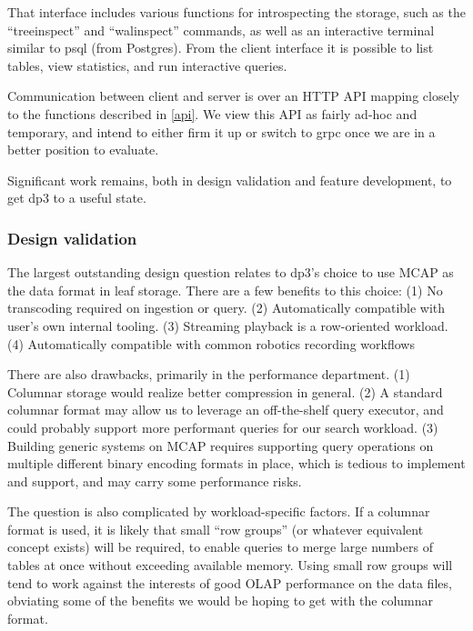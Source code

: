 \documentclass[9pt,twocolumn]{article}
\newcommand{\q}[1]{``#1''}
\begin{document}
    That interface includes various functions for introspecting the storage,
    such as the \q{treeinspect} and \q{walinspect} commands, as well as an
    interactive terminal similar to psql (from Postgres). From the client
    interface it is possible to list tables, view statistics, and run
    interactive queries.

    Communication between client and server is over an HTTP API mapping closely
    to the functions described in \ref{api}. We view this API as fairly ad-hoc
    and temporary, and intend to either firm it up or switch to grpc once we
    are in a better position to evaluate.

    Significant work remains, both in design validation and feature
    development, to get dp3 to a useful state.


    \subsubsection{Design validation}
    The largest outstanding design question relates to dp3’s choice to use MCAP
    as the data format in leaf storage. There are a few benefits to this
    choice: (1) No transcoding required on ingestion or query. (2)
    Automatically compatible with user’s own internal tooling. (3) Streaming
    playback is a row-oriented workload. (4) Automatically compatible with
    common robotics recording workflows

    There are also drawbacks, primarily in the performance department. (1)
    Columnar storage would realize better compression in general. (2) A
    standard columnar format may allow us to leverage an off-the-shelf query
    executor, and could probably support more performant queries for our search
    workload. (3) Building generic systems on MCAP requires supporting query
    operations on multiple different binary encoding formats in place, which is
    tedious to implement and support, and may carry some performance risks.

    The question is also complicated by workload-specific factors. If a
    columnar format is used, it is likely that small \q{row groups} (or
    whatever equivalent concept exists) will be required, to enable queries to
    merge large numbers of tables at once without exceeding available memory.
    Using small row groups will tend to work against the interests of good OLAP
    performance on the data files, obviating some of the benefits we would be
    hoping to get with the columnar format.
\end{document}
